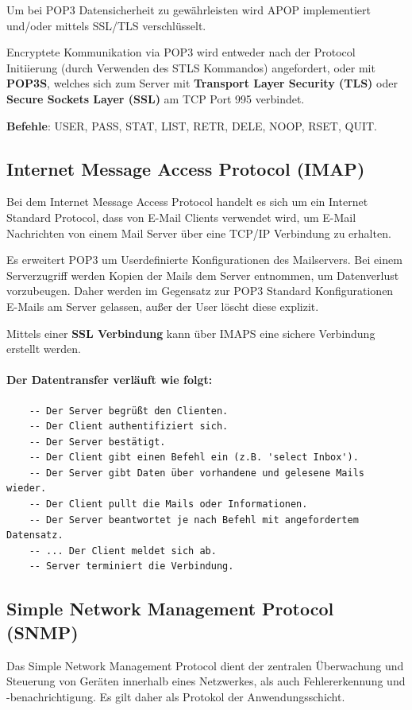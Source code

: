 \documentclass{scrartcl}
\begin{document}
    Um bei POP3 Datensicherheit zu gewährleisten wird APOP implementiert und/oder mittels SSL/TLS verschlüsselt. 

    Encryptete Kommunikation via POP3 wird entweder nach der Protocol Initiierung (durch Verwenden des STLS Kommandos) angefordert, 
    oder mit \textbf{POP3S}, welches sich zum Server mit \textbf{Transport Layer Security (TLS)} oder \textbf{Secure Sockets Layer (SSL)} am TCP Port 995 verbindet.
    
    \textbf{Befehle}: USER, PASS, STAT, LIST, RETR, DELE, NOOP, RSET, QUIT.

    \subsection{Internet Message Access Protocol (IMAP)}
    \label{protocols:imap}
    Bei dem Internet Message Access Protocol handelt es sich um ein Internet Standard Protocol, 
    dass von E-Mail Clients verwendet wird, 
    um E-Mail Nachrichten von einem Mail Server über eine TCP/IP Verbindung zu erhalten.

    Es erweitert POP3 um Userdefinierte Konfigurationen des Mailservers. 
    Bei einem Serverzugriff werden Kopien der Mails dem Server entnommen, 
    um Datenverlust vorzubeugen.
    Daher werden im Gegensatz zur POP3 Standard Konfigurationen E-Mails am Server gelassen,
    außer der User löscht diese explizit.

    Mittels einer \textbf{SSL Verbindung} kann über IMAPS eine sichere Verbindung erstellt werden.

    \paragraph{Der Datentransfer verläuft wie folgt:}
    \begin{verbatim}
    -- Der Server begrüßt den Clienten.
    -- Der Client authentifiziert sich.
    -- Der Server bestätigt.
    -- Der Client gibt einen Befehl ein (z.B. 'select Inbox').
    -- Der Server gibt Daten über vorhandene und gelesene Mails wieder.
    -- Der Client pullt die Mails oder Informationen.
    -- Der Server beantwortet je nach Befehl mit angefordertem Datensatz.
    -- ... Der Client meldet sich ab.
    -- Server terminiert die Verbindung.
    \end{verbatim}
    
    \subsection{Simple Network Management Protocol (SNMP)}
    \label{protocols:snmp}
    Das Simple Network Management Protocol dient der zentralen Überwachung und Steuerung von Geräten innerhalb eines Netzwerkes, als auch Fehlererkennung und -benachrichtigung. Es gilt daher als Protokol der Anwendungsschicht.
    
\end{document}
